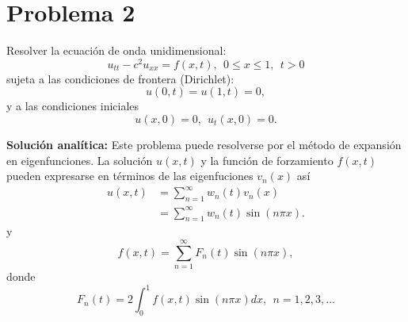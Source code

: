 \documentclass[11pt]{article}
\begin{document}


\clearpage
\section*{Problema 2}
Resolver la ecuaci\'on de onda unidimensional:
\begin{equation}
  \label{eq:onda_nh}
  u_{tt} - c^2 u_{xx} = f(x,t),~~0 \le x \le 1,~~t>0
\end{equation}
sujeta a las condiciones de frontera (Dirichlet):
\begin{equation}
  \label{eq:dirich}
  u(0,t) = u(1,t) = 0,
\end{equation}
y a las condiciones iniciales
\begin{equation}
  \label{eq:6}
  u(x,0) = 0,~~u_t(x,0)=0.
\end{equation}

{\bf Soluci\'on anal\'itica:} Este problema puede resolverse por el m\'etodo de expansi\'on en eigenfunciones. La soluci\'on $u(x,t)$ y la funci\'on de forzamiento $f(x,t)$ pueden expresarse en t\'erminos de las eigenfuciones $v_n(x)$ as\'i
\begin{align}
  \label{eq:uxt}
u(x,t) &= \displaystyle\sum_{n=1}^\infty w_n(t)v_n(x) \\
       &= \displaystyle\sum_{n=1}^\infty w_n(t)\sin(n\pi x). 
\end{align}
y
\begin{equation}
  \label{eq:fxt}
  f(x,t) = \sum_{n=1}^\infty F_n(t)\sin(n\pi x),
\end{equation}
donde
\begin{equation}
  \label{eq:16}
  F_n(t) = 2 \int_0^1 f(x,t)\sin(n\pi x) dx,~~n=1,2,3,...
\end{equation}
\end{document}
